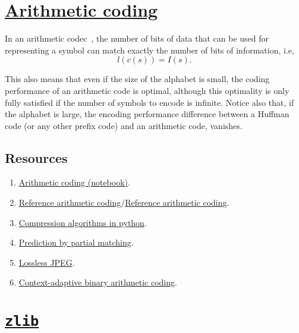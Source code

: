 \section{\href{https://en.wikipedia.org/wiki/Arithmetic_coding}{Arithmetic
    coding}}

In an arithmetic codec~\cite{vruiz__arithmetic_coding,ruiz2000compresion}, the number of
bits of data that can be used for representing a symbol can match
exactly the number of bits of information, i.e,
\begin{equation}
  l(c(s)) = I(s).
\end{equation}

This also means that even if the size of the alphabet is small, the
coding performance of an arithmetic code is optimal, although this
optimality is only fully satisfied if the number of symbols to encode
is infinite. Notice also that, if the alphabet is large, the encoding
performance difference between a Huffman code (or any other prefix
code) and an arithmetic code, vanishes.

\subsection*{Resources}
\begin{enumerate}
\item
  \href{https://github.com/vicente-gonzalez-ruiz/arithmetic_coding/blob/master/src/arithmetic_coding/arithmetic_coding.ipynb}{Arithmetic
    coding (notebook)}.
\item \href{https://www.nayuki.io/page/reference-arithmetic-coding}{Reference arithmetic coding}/\href{https://github.com/nayuki/Reference-arithmetic-coding}{Reference arithmetic coding}.
\item \href{https://www.inference.org.uk/mackay/python/compress/#AC}{Compression algorithms in python}.
\item \href{https://en.wikipedia.org/wiki/Prediction_by_partial_matching}{Prediction by partial matching}.
\item \href{https://en.wikipedia.org/wiki/Lossless_JPEG}{Lossless JPEG}.
\item \href{https://en.wikipedia.org/wiki/Context-adaptive_binary_arithmetic_coding}{Context-adaptive binary arithmetic coding}.
\end{enumerate}

\section{\href{https://zlib.net/}{\texttt{zlib}}}

